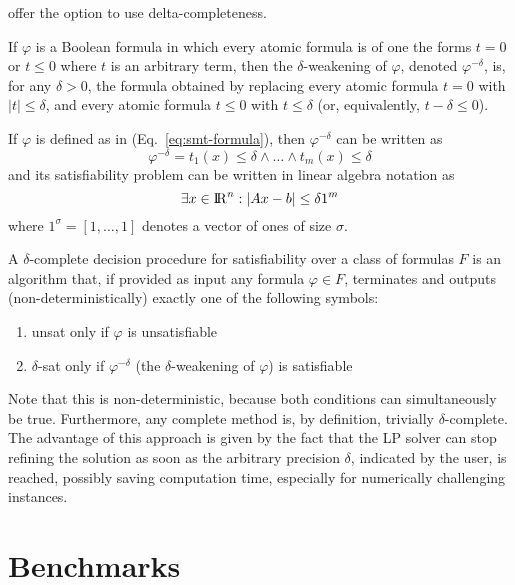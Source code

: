 \documentclass[runningheads]{llncs}
\begin{document}
\dlinear offer the option to use delta-completeness.

\begin{definition}
    If $\varphi$ is a Boolean formula in which every atomic formula is of one the forms $t = 0$ or $t \le 0$ where $t$ is an arbitrary term, then the $\delta$-weakening of $\varphi$, denoted $\varphi^{-\delta}$, is, for any $\delta > 0$, the formula obtained by replacing every atomic formula $t = 0$ with $|t| \le \delta$, and every atomic formula $t \le 0$ with $t \le \delta$ (or, equivalently, $t - \delta \le 0$).
\end{definition}
If $\varphi$ is defined as in (Eq.~\ref{eq:smt-formula}), then $\varphi^{-\delta}$ can be written as
\begin{equation*}
    \varphi^{-\delta} = t_1(x) \le \delta \land \ldots \land t_m(x) \le \delta
\end{equation*}
and its satisfiability problem can be written in linear algebra notation as
\begin{equation}
    \label{eq:delta-sat}
    \exists x \in {\rm I\!R}^n : |Ax - b| \le \delta 1^m
\end{equation}
where $1^\sigma = [1, \ldots, 1]$ denotes a vector of ones of size $\sigma$.
\begin{definition}
    A $\delta$-complete decision procedure for satisfiability over a class of formulas $F$ is an algorithm that, if provided as input any formula $\varphi \in F$, terminates and outputs (non-deterministically) exactly one of the following symbols:
    \begin{enumerate}
        \item unsat only if $\varphi$ is unsatisfiable
        \item $\delta$-sat only if $\varphi^{-\delta}$ (the $\delta$-weakening of $\varphi$) is satisfiable
    \end{enumerate}
\end{definition}
Note that this is non-deterministic, because both conditions can simultaneously be true.
Furthermore, any complete method is, by definition, trivially $\delta$-complete.
The advantage of this approach is given by the fact that the LP solver can stop refining the solution as soon as the arbitrary precision $\delta$, indicated by the user, is reached, possibly saving computation time, especially for numerically challenging instances.

\section{Benchmarks}
\end{document}

